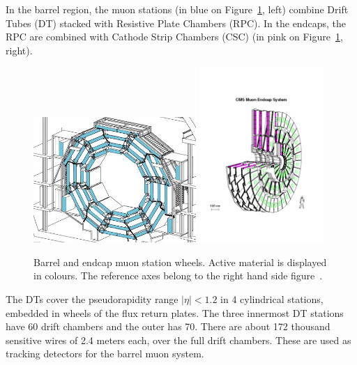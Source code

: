 In the barrel region, the muon stations (in blue on
Figure~\ref{fig:muonstations}, left) combine Drift Tubes (DT)
stacked with Resistive Plate Chambers (RPC). In the endcaps, the RPC
are combined with Cathode Strip Chambers (CSC) (in pink on
Figure~\ref{fig:muonstations}, right).


\begin{figure}[htb]
  \begin{center}
    \includegraphics[width=0.55\textwidth]{Chapters/xLHCMS/dt-wheel.jpg}
    \includegraphics[width=0.42\textwidth]{Chapters/xLHCMS/csc-wheel.pdf}
    \caption{Barrel and endcap muon station wheels. Active material
     is displayed in colours. The reference axes belong to the right
     hand side figure~\cite{Chatrchyan:2013sba}.}
    \label{fig:muonstations}
  \end{center}
\end{figure}


The DTs cover the pseudorapidity range $\vert\eta\vert < 1.2$ in 4
cylindrical stations, embedded in wheels of the flux return
plates. The three innermost DT stations have 60 drift chambers and the
outer has 70. There are about 172 thousand sensitive wires of 2.4
meters each, over the full drift chambers. These are used as tracking
detectors for the barrel muon system.

